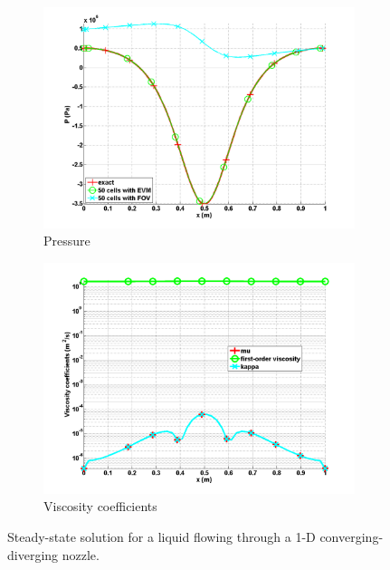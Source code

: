 \documentclass[review,10pt]{elsarticle}
\begin{document}
\begin{figure}[H]
        \begin{subfigure}[b]{0.495\textwidth}
                \centering
                \includegraphics[width=\textwidth]{figures/liquid_pressure_numerical_and_exact_50.png}
                \caption{Pressure}
                \label{fig:1d_nozzle_liq_press}
        \end{subfigure}        
        \begin{subfigure}[b]{0.495\textwidth}
                \centering
                \includegraphics[width=\textwidth]{figures/liquid_viscosity_numerical50.png}
                \caption{Viscosity coefficients}
                \label{fig:1d_nozzle_liq_visc}
        \end{subfigure}
        \caption{Steady-state solution for a liquid flowing through a 1-D converging-diverging nozzle.}\label{fig:1d_liq_nozzle}
\end{figure}
\end{document}

